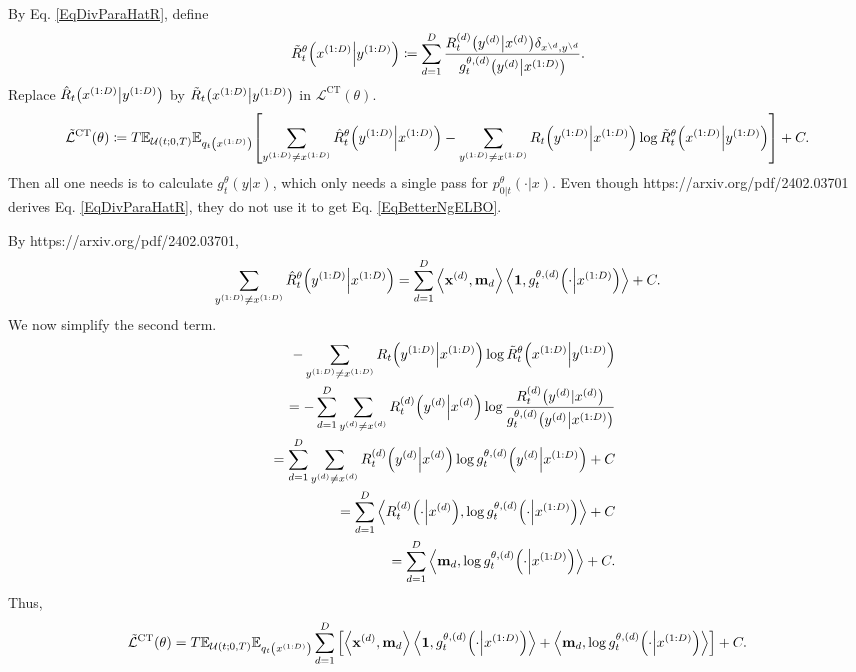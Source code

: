 \documentclass[10pt]{article}
\begin{document}
By Eq. \eqref{EqDivParaHatR}, define
\begin{eqnarray}
  \tilde{R}^\theta_t\qty(x^{(1:D)}\middle|y^{(1:D)})\coloneq\sum_{d=1}^D \frac{R^{(d)}_t\qty(y^{(d)}\middle| x^{(d)})\delta_{x^{\setminus d},y^{\setminus d}}}{g^{\theta,(d)}_t\qty(y^{(d)}\middle|x^{(1:D)})}.
\end{eqnarray}
Replace $\hat{R}_t\qty(x^{(1:D)}\middle|y^{(1:D)})$ by $\tilde{R}_t\qty(x^{(1:D)}\middle|y^{(1:D)})$ in $\mathcal{L}^\text{CT}(\theta)$.
\begin{eqnarray}\label{EqBetterNgELBO}
  \tilde{\mathcal{L}}^\text{CT}(\theta)\coloneq T\mathbb{E}_{\mathcal{U}(t;0,T)}\mathbb{E}_{q_t\qty(x^{(1:D)})}\qty[\sum_{y^{(1:D)}\neq x^{(1:D)}}\hat{R}_t^\theta\qty(y^{(1:D)}\middle|x^{(1:D)}) - \sum_{y^{(1:D)}\neq x^{(1:D)}}R_t\qty(y^{(1:D)}\middle|x^{(1:D)})\log\tilde{R}_t^\theta\qty(x^{(1:D)}\middle|y^{(1:D)})] + C.
\end{eqnarray}
Then all one needs is to calculate $g^\theta_t(y|x)$, which only needs a single pass for $p^\theta_{0|t}(\cdot|x)$. Even though https://arxiv.org/pdf/2402.03701 derives Eq. \eqref{EqDivParaHatR}, they do not use it to get Eq. \eqref{EqBetterNgELBO}.

By https://arxiv.org/pdf/2402.03701,
\begin{eqnarray*}
  \sum_{y^{(1:D)}\neq x^{(1:D)}}\hat{R}_t^\theta\qty(y^{(1:D)}\middle|x^{(1:D)})=\sum_{d=1}^D\left\langle\mathbf{x}^{(d)},\mathbf{m}_d\right\rangle\left\langle\mathbf{1},g^{\theta,(d)}_t\qty(\cdot\middle|x^{(1:D)})\right\rangle + C.
\end{eqnarray*}
We now simplify the second term.
\begin{eqnarray*}
  &&- \sum_{y^{(1:D)}\neq x^{(1:D)}}R_t\qty(y^{(1:D)}\middle|x^{(1:D)})\log\tilde{R}_t^\theta\qty(x^{(1:D)}\middle|y^{(1:D)})\\
  &&=-\sum_{d=1}^D\sum_{y^{(d)}\neq x^{(d)}}R^{(d)}_t\qty(y^{(d)}\middle|x^{(d)})\log\frac{R_t^{(d)}\qty(y^{(d)}|x^{(d)})}{g^{\theta,(d)}_t\qty(y^{(d)}\middle|x^{(1:D)})}\\
  &&=\sum_{d=1}^D\sum_{y^{(d)}\neq x^{(d)}}R^{(d)}_t\qty(y^{(d)}\middle|x^{(d)})\log g^{\theta,(d)}_t\qty(y^{(d)}\middle|x^{(1:D)}) + C\\
  &&=\sum_{d=1}^D \left\langle R^{(d)}_t\qty(\cdot\middle|x^{(d)}),\log g^{\theta,(d)}_t\qty(\cdot\middle|x^{(1:D)})\right\rangle + C\\
  &&=\sum_{d=1}^D \left\langle \mathbf{m}_d,\log g^{\theta,(d)}_t\qty(\cdot\middle|x^{(1:D)})\right\rangle + C.
\end{eqnarray*}
Thus,
\begin{eqnarray*}
  \tilde{\mathcal{L}}^\text{CT}(\theta)=T\mathbb{E}_{\mathcal{U}(t;0,T)}\mathbb{E}_{q_t\qty(x^{(1:D)})}\sum_{d=1}^D\qty[\left\langle\mathbf{x}^{(d)},\mathbf{m}_d\right\rangle\left\langle\mathbf{1},g^{\theta,(d)}_t\qty(\cdot\middle|x^{(1:D)})\right\rangle + \left\langle \mathbf{m}_d,\log g^{\theta,(d)}_t\qty(\cdot\middle|x^{(1:D)})\right\rangle] + C.
\end{eqnarray*}
\end{document}
